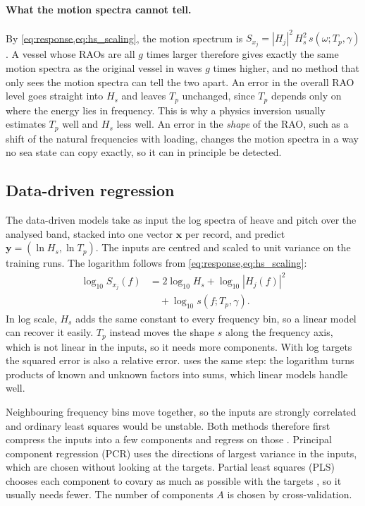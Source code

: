 \documentclass[10pt,a4paper,twocolumn,twoside]{article}
\newcommand{\Hs}{H_{s}}
\newcommand{\Tp}{T_{p}}
\newcommand{\vect}[1]{\boldsymbol{#1}}
\begin{document}
\paragraph{What the motion spectra cannot tell.}
By \cref{eq:response,eq:hs_scaling}, the motion spectrum is $S_{x_j} = |H_j|^2\,\Hs^2\,s(\omega;\Tp,\gamma)$.
A vessel whose RAOs are all $g$ times larger therefore gives exactly the same motion spectra as the
original vessel in waves $g$ times higher, and no method that only sees the motion spectra can tell
the two apart. An error in the overall RAO level goes straight into $\Hs$ and leaves $\Tp$
unchanged, since $\Tp$ depends only on where the energy lies in frequency. This is why a physics
inversion usually estimates $\Tp$ well and $\Hs$ less well. An error in the \emph{shape} of the
RAO, such as a shift of the natural frequencies with loading, changes the motion spectra in a way no
sea state can copy exactly, so it can in principle be detected.

\subsection{Data-driven regression}
\label{sec:theory_regression}

The data-driven models take as input the log spectra of heave and pitch over the analysed band,
stacked into one vector $\vect x$ per record, and predict $\vect y = (\ln\Hs, \ln\Tp)$. The inputs
are centred and scaled to unit variance on the training runs. The logarithm follows from
\cref{eq:response,eq:hs_scaling}:
\begin{equation}
\begin{split}
\log_{10} S_{x_j}(f) &= 2\log_{10}\Hs + \log_{10}|H_j(f)|^2 \\
&\quad + \log_{10} s(f; \Tp, \gamma).
\end{split}
\label{eq:log_linear}
\end{equation}
In log scale, $\Hs$ adds the same constant to every frequency bin, so a linear model can recover it
easily. $\Tp$ instead moves the shape $s$ along the frequency axis, which is not linear in the
inputs, so it needs more components. With log targets the squared error is also a relative error.
\citet{martens2023} uses the same step: the logarithm turns products of known and unknown factors
into sums, which linear models handle well.

Neighbouring frequency bins move together, so the inputs are strongly correlated and ordinary least
squares would be unstable. Both methods therefore first compress the inputs into a few components
and regress on those \citep{hastie2009}. Principal component regression (PCR) uses the directions
of largest variance in the inputs, which are chosen without looking at the targets. Partial least
squares (PLS) chooses each component to covary as much as possible with the targets
\citep{wold2001}, so it usually needs fewer. The number of components $A$ is chosen by
cross-validation.
\end{document}
